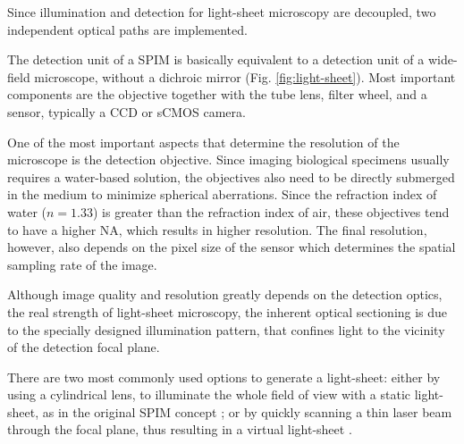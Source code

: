 

    Since illumination and detection for light-sheet microscopy are decoupled, two independent optical paths are implemented.
    
    The detection unit of a SPIM is basically equivalent to a detection unit of a wide-field microscope, without a dichroic mirror (Fig. \ref{fig:light-sheet}). Most important components are the objective together with the tube lens, filter wheel, and a sensor, typically a CCD or sCMOS camera.

    One of the most important aspects that determine the resolution of the microscope is the detection objective. Since imaging biological specimens usually requires a water-based solution, the objectives also need to be directly submerged in the medium to minimize spherical aberrations. Since the refraction index of water ($n=1.33$) is greater than the refraction index of air, these objectives tend to have a higher NA, which results in higher resolution. The final resolution, however, also depends on the pixel size of the sensor which determines the spatial sampling rate of the image.

    Although image quality and resolution greatly depends on the detection optics, the real strength of light-sheet microscopy, the inherent optical sectioning is due to the specially designed illumination pattern, that confines light to the vicinity of the detection focal plane.

    There are two most commonly used options to generate a light-sheet: either by using a cylindrical lens, to illuminate the whole field of view with a static light-sheet, as in the original SPIM concept \cite{huisken_optical_2004}; or by quickly scanning a thin laser beam through the focal plane, thus resulting in a virtual light-sheet \cite{keller_reconstruction_2008}.


